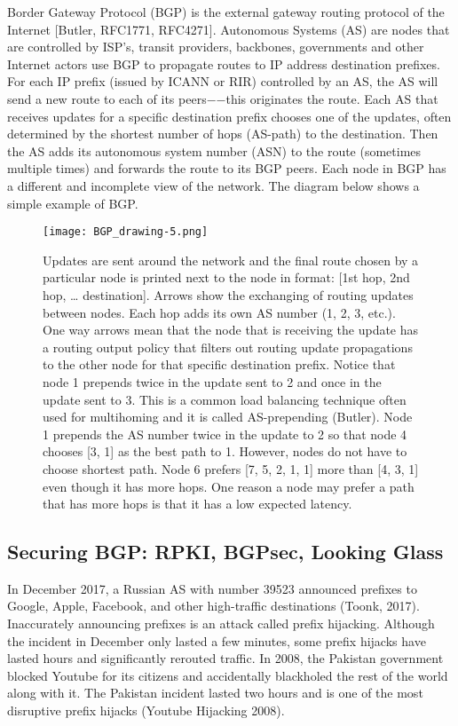 \documentclass[letterpaper, 10 pt, conference]{ieeeconf}  %
\begin{document}
Border Gateway Protocol (BGP) is the external gateway routing protocol of the Internet [Butler, RFC1771, RFC4271]. Autonomous Systems (AS) are nodes that are controlled by ISP’s, transit providers, backbones, governments and other Internet actors use BGP to propagate routes to IP address destination prefixes. For each IP prefix (issued by ICANN or RIR) controlled by an AS, the AS will send a new route to each of its peers−−this originates the route. Each AS that receives updates for a specific destination prefix chooses one of the updates, often determined by the shortest number of hops (AS-path) to the destination. Then the AS adds its autonomous system number (ASN) to the route (sometimes multiple times) and forwards the route to its BGP peers. Each node in BGP has a different and incomplete view of the network. The diagram below shows a simple example of BGP.

\begin{figure}[h!]
	\centering
	\texttt{[image: BGP\_drawing-5.png]}
\caption{Updates are sent around the network and the final route chosen by a particular node is printed next to the node in format: [1st hop, 2nd hop, … destination]. Arrows show the exchanging of routing updates between nodes. Each hop adds its own AS number (1, 2, 3, etc.). One way arrows mean that the node that is receiving the update has a routing output policy that filters out routing update propagations to the other node for that specific destination prefix. Notice that node 1 prepends twice in the update sent to 2 and once in the update sent to 3. This is a common load balancing technique often used for multihoming and it is called AS-prepending (Butler). Node 1 prepends the AS number twice in the update to 2 so that node 4 chooses [3, 1] as the best path to 1. However, nodes do not have to choose shortest path. Node 6 prefers [7, 5, 2, 1, 1] more than [4, 3, 1] even though it has more hops. One reason a node may prefer a path that has more hops is that it has a low expected latency. 
}
\end{figure}

\subsection{Securing BGP: RPKI, BGPsec, Looking Glass}

In December 2017, a Russian AS with number 39523 announced prefixes to Google, Apple, Facebook, and other high-traffic destinations (Toonk, 2017). Inaccurately announcing prefixes is an attack called prefix hijacking. Although the incident in December only lasted a few minutes, some prefix hijacks have lasted hours and significantly rerouted traffic. In 2008, the Pakistan government blocked Youtube for its citizens and accidentally blackholed the rest of the world along with it. The Pakistan incident lasted two hours and is one of the most disruptive prefix hijacks (Youtube
Hijacking 2008). 
\end{document}
